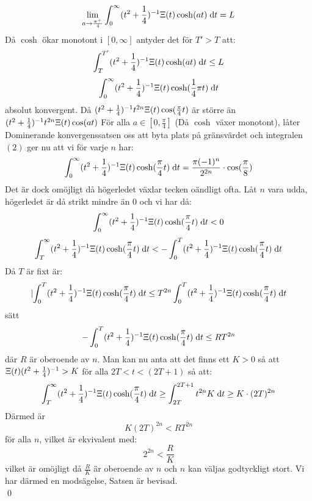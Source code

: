 \documentclass[a4paper,twoside]{article}%
\begin{document}
\newcommand{\thisint} {
	(t^2 + \frac 1 4)^{-1} \skit\cosh
}
\[
	\lim_{a \to \frac {\pi^+} {4}} \int_0^\infty \thisint(at) \ud t = L
\]
Då $\cosh$ ökar monotont i $[0, \infty]$ antyder det för $T' > T$ att:
\[
	\int_T^{T'}\thisint(at) \ud t \leq L
\]
\[
	\int_0^\infty\thisint(\frac 1 4 \pi t) \ud t
\]
\newcommand{\myeq}[1]{
	(t^2 + \frac 1 4)^{-1}t^{2n}\skit\cos(#1)
}
absolut konvergent. Då $\myeq{\frac \pi 4 t}$ är större än $\myeq{at}$ För alla $a \in [0, \frac \pi 4]$ (Då $\cosh$ växer monotont), låter
Dominerande konvergenssatsen oss att byta plats på gränsvärdet och integralen $(2)$ ger nu att vi för varje $n$ har:
\[
	\int_0^\infty \thisint(\frac \pi 4 t) \ud t = \frac {\pi (-1)^n} {2^{2n}} \cdot \cos(\frac \pi 8)
\]
Det är dock omöjligt då högerledet växlar tecken oändligt ofta. Låt $n$ vara udda,
högerledet är då strikt mindre än $0$ och vi har då:
\newcommand{\thislaser}[2]{
	\int_{#1}^{#2}\thisint(\frac \pi 4 t) \ud t
}
\[
	\thislaser{0}{\infty} < 0
\]
\[
	\thislaser{T}{\infty} < -\thislaser{0}{T}
\]
Då $T$ är fixt är:
\[
	\lvert \thislaser{0}{T} \leq T^{2n} \thislaser 0 T
\]
sätt
\[
	-\thislaser 0 T \leq RT^{2n}
\]
där $R$ är oberoende av $n$. Man kan nu anta att det finns ett $K > 0$ så att
$\Xi(t)(t^2 + \frac 1 4)^{-1} > K$ för alla $2T < t < (2T + 1)$ så att:
\[
	\thislaser T \infty \geq \int_{2T}^{2T + 1} t^{2n} K \ud t \geq K \cdot (2T)^{2n}
\]
Därmed är
\[
	K(2T)^{2n} < RT^{2n}
\]
för alla $n$, vilket är ekvivalent med:
\[
	2^{2n} < \frac R K
\]
vilket är omöjligt då $\frac R K$ är oberoende
av $n$ och $n$ kan väljas godtyckligt stort.
Vi har därmed en modsägelse, Satsen är bevisad.\\
\hfill\qed

\end{document}
